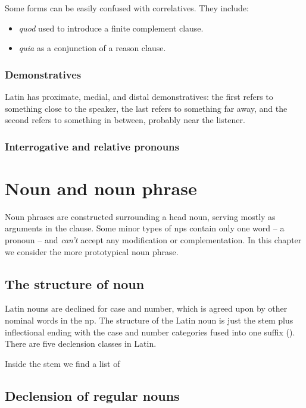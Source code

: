 \documentclass[a4paper, oneside, 12pt]{report}
\newcommand{\form}[1]{\emph{#1}}
\begin{document}
Some forms can be easily confused with correlatives.
They include:
\begin{itemize}
    \item \form{quod} used to introduce a finite complement clause.
    \item \form{quia} as a conjunction of a reason clause.
\end{itemize}

\subsection{Demonstratives}

Latin has proximate, medial, and distal demonstratives:
the first refers to something close to the speaker, 
the last refers to something far away,
and the second refers to something in between,
probably near the listener.

\subsection{Interrogative and relative pronouns}

\chapter{Noun and noun phrase}\label{chap:np}

Noun phrases are constructed surrounding a head noun, 
serving mostly as arguments in the clause.
Some minor types of \acs{np}s contain only one word -- a pronoun --  
and \emph{can't} accept any modification or complementation.
In this chapter we consider the more prototypical noun phrase.

\section{The structure of noun}\label{sec:np.noun}

Latin nouns are declined for case and number,
which is agreed upon by other nominal words in the \acs{np}.
The structure of the Latin noun is just
the stem plus inflectional ending 
with the case and number categories fused into one suffix
().
There are five declension classes in Latin.

Inside the stem we find a list of 

\section{Declension of regular nouns}\label{sec:regular-noun-declension}
\end{document}
